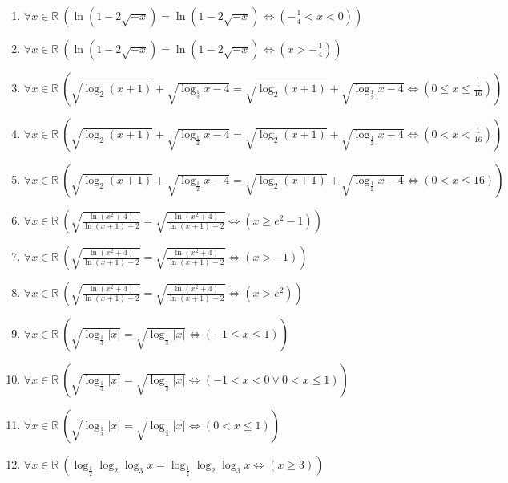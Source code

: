 \documentclass[11pt,a4paper]{article}
\begin{document}
\begin{enumerate}
\item $\displaystyle \forall x \in \mathbb{R}\ \left( \ln(1 - 2\sqrt{-x}) = \ln(1 - 2\sqrt{-x}) \iff \left( -\frac{1}{4} < x < 0 \right) \right)$
\item $\displaystyle \forall x \in \mathbb{R}\ \left( \ln(1 - 2\sqrt{-x}) = \ln(1 - 2\sqrt{-x}) \iff \left( x > -\frac{1}{4} \right) \right)$
\item $\displaystyle \forall x \in \mathbb{R}\ \left( \sqrt{\log_{2}(x + 1)} + \sqrt{\log_{\frac{1}{2}} x - 4} = \sqrt{\log_{2}(x + 1)} + \sqrt{\log_{\frac{1}{2}} x - 4} \iff \left( 0 \le x \le \frac{1}{16} \right) \right)$
\item $\displaystyle \forall x \in \mathbb{R}\ \left( \sqrt{\log_{2}(x + 1)} + \sqrt{\log_{\frac{1}{2}} x - 4} = \sqrt{\log_{2}(x + 1)} + \sqrt{\log_{\frac{1}{2}} x - 4} \iff \left( 0 < x < \frac{1}{16} \right) \right)$
\item $\displaystyle \forall x \in \mathbb{R}\ \left( \sqrt{\log_{2}(x + 1)} + \sqrt{\log_{\frac{1}{2}} x - 4} = \sqrt{\log_{2}(x + 1)} + \sqrt{\log_{\frac{1}{2}} x - 4} \iff \left( 0 < x \le 16 \right) \right)$
\item $\displaystyle \forall x \in \mathbb{R}\ \left( \sqrt{\frac{\ln(x^{2} + 4)}{\ln(x + 1) - 2}} = \sqrt{\frac{\ln(x^{2} + 4)}{\ln(x + 1) - 2}} \iff \left( x \ge e^{2} - 1 \right) \right)$
\item $\displaystyle \forall x \in \mathbb{R}\ \left( \sqrt{\frac{\ln(x^{2} + 4)}{\ln(x + 1) - 2}} = \sqrt{\frac{\ln(x^{2} + 4)}{\ln(x + 1) - 2}} \iff \left( x > -1 \right) \right)$
\item $\displaystyle \forall x \in \mathbb{R}\ \left( \sqrt{\frac{\ln(x^{2} + 4)}{\ln(x + 1) - 2}} = \sqrt{\frac{\ln(x^{2} + 4)}{\ln(x + 1) - 2}} \iff \left( x > e^{2} \right) \right)$
\item $\displaystyle \forall x \in \mathbb{R}\ \left( \sqrt{\log_{\frac{1}{3}}\left| x \right|} = \sqrt{\log_{\frac{1}{3}}\left| x \right|} \iff \left( -1 \le x \le 1 \right) \right)$
\item $\displaystyle \forall x \in \mathbb{R}\ \left( \sqrt{\log_{\frac{1}{3}}\left| x \right|} = \sqrt{\log_{\frac{1}{3}}\left| x \right|} \iff \left( -1 < x < 0 \lor 0 < x \le 1 \right) \right)$
\item $\displaystyle \forall x \in \mathbb{R}\ \left( \sqrt{\log_{\frac{1}{3}}\left| x \right|} = \sqrt{\log_{\frac{1}{3}}\left| x \right|} \iff \left( 0 < x \le 1 \right) \right)$
\item $\displaystyle \forall x \in \mathbb{R}\ \left( \log_{\frac{1}{2}}\log_{2}\log_{3} x = \log_{\frac{1}{2}}\log_{2}\log_{3} x \iff \left( x \ge 3 \right) \right)$

\end{enumerate}
\end{document}
